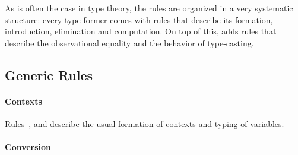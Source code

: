 As is often the case in type theory, the rules are organized in a very 
systematic structure:
% 
every type former comes with rules that describe its formation, introduction, 
elimination and computation.
% 
On top of this, \SetoidCC adds rules that describe the observational equality 
and the behavior of type-casting.

\subsection{Generic Rules}

\paragraph*{Contexts}
Rules~,  and  describe the
usual formation of contexts and typing of variables. 
% 

\paragraph*{Conversion}

